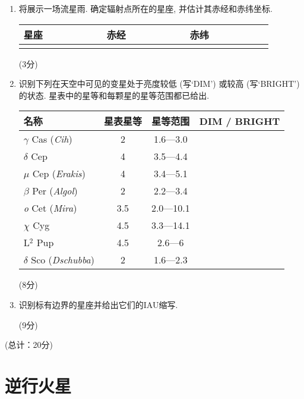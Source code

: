 \documentclass[a4paper,fontset=fandol]{ctexart}
\newcommand{\points}[1]{\par %
	\noindent %
	\hfill (#1分)%
	\vspace{1em}
	}
\begin{document}
	\begin{enumerate}[label=(\alph*)]
		\item 将展示一场流星雨. 确定辐射点所在的星座, 并估计其赤经和赤纬坐标. 
		
		\begin{table}[!h]
			\centering
			\begin{tabular}{|c|l|l|}
				\hline
				星座~~~~~~~~~~ & 赤经~~~~~~~~~~ & 赤纬~~~~~~~~~~ \\
				\hline
				&&\\
				\hline
			\end{tabular}
		\end{table}
		\points{3}
		
		\vspace{0em}
		\item 识别下列在天空中可见的变星处于亮度较低 (写`DIM') 或较高 (写`BRIGHT') 的状态. 星表中的星等和每颗星的星等范围都已给出. 
		
		\begin{table}[!h]
			\centering
			\begin{tabular}{|l|c|c|c|}
				\hline
				名称 & 星表星等 & 星等范围 & DIM / BRIGHT \\
				\hline
				$\gamma$ Cas (\textit{Cih}) & 2 & 1.6---3.0 & \\
				\hline
				$\delta$ Cep & 4 & 3.5---4.4 & \\
				\hline
				$\mu$ Cep (\textit{Erakis}) & 4 & 3.4---5.1 & \\
				\hline
				$\beta$ Per (\textit{Algol}) & 2 & 2.2---3.4 & \\
				\hline
				\textit{o} Cet (\textit{Mira}) & 3.5 & 2.0---10.1 & \\
				\hline
				$\chi$ Cyg & 4.5 & 3.3---14.1 & \\
				\hline
				L$^2$ Pup & 4.5 & 2.6---6 & \\
				\hline
				$\delta$ Sco (\textit{Dschubba}) & 2 & 1.6---2.3 & \\
				\hline
			\end{tabular}
		\end{table}
		\points{8}
		
		\vspace{0em}
		\item 识别标有边界的星座并给出它们的IAU缩写. 
		\points{9}
	\end{enumerate}
	\points{总计：20}
	
	\newpage
	\section{逆行火星}
	
\end{document}
